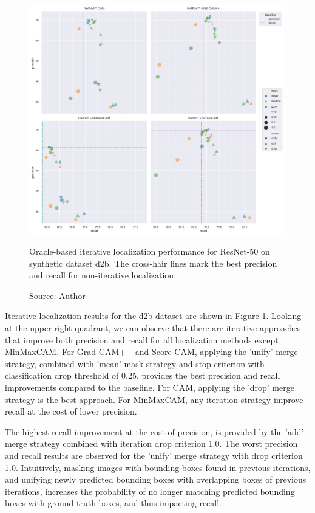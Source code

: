 \begin{figure}[h]
    \begin{center}       
    \includegraphics[width=0.99\textwidth]{images/fig_iter_resnet50_syn_d2b.png}
    \caption[Oracle-based iterative localization performance for ResNet-50 on synthetic dataset d2b]{Oracle-based iterative localization performance for ResNet-50 on synthetic dataset d2b. The cross-hair lines mark the best precision and recall for non-iterative localization.}
    \caption*{Source: Author}
    \label{fig:prec_iter_resnet50_syn_d2b}
    \end{center}
\end{figure}

Iterative localization results for the d2b dataset are shown in Figure \ref{fig:prec_iter_resnet50_syn_d2b}. Looking at the upper right quadrant, we can observe that there are iterative approaches that improve both precision and recall for all localization methods except MinMaxCAM. For Grad-CAM++ and Score-CAM, applying the 'unify' merge strategy, combined with 'mean' mask strategy and stop criterion with classification drop threshold of 0.25, provides the best precision and recall improvements compared to the baseline. For CAM, applying the 'drop' merge strategy is the best approach. For MinMaxCAM, any iteration strategy improve recall at the cost of lower precision. 

The highest recall improvement at the cost of precision, is provided by the 'add' merge strategy combined with iteration drop criterion 1.0. The worst precision and recall results are observed for the 'unify' merge strategy with drop criterion 1.0. Intuitively, masking images with bounding boxes found in previous iterations, and unifying newly predicted bounding boxes with overlapping boxes of previous iterations, increases the probability of no longer matching predicted bounding boxes with ground truth boxes, and thus impacting recall.

